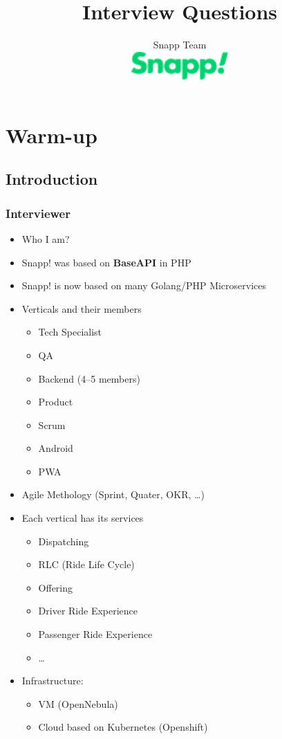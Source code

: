 \documentclass[]{book}
\begin{document}
\title{Interview Questions}
\author{%
  Snapp Team \\[1cm]
  \includegraphics[width=10em]{./snapp.png}
}

\maketitle

\chapter{Warm-up}

\section{Introduction}

\subsection{Interviewer}
\begin{itemize}
  \item Who I am?
  \item Snapp! was based on \textbf{BaseAPI} in PHP
  \item Snapp! is now based on many Golang/PHP Microservices
  \item Verticals and their members
    \begin{itemize}
      \item Tech Specialist
      \item QA
      \item Backend (4--5 members)
      \item Product
      \item Scrum
      \item Android
      \item PWA
    \end{itemize}
  \item Agile Methology (Sprint, Quater, OKR, \ldots)
  \item Each vertical has its services
    \begin{itemize}
      \item Dispatching
      \item RLC (Ride Life Cycle)
      \item Offering
      \item Driver Ride Experience
      \item Passenger Ride Experience
      \item \ldots
    \end{itemize}
  \item Infrastructure:
    \begin{itemize}
      \item VM (OpenNebula)
      \item Cloud based on Kubernetes (Openshift)
    \end{itemize}
\end{itemize}
\end{document}
